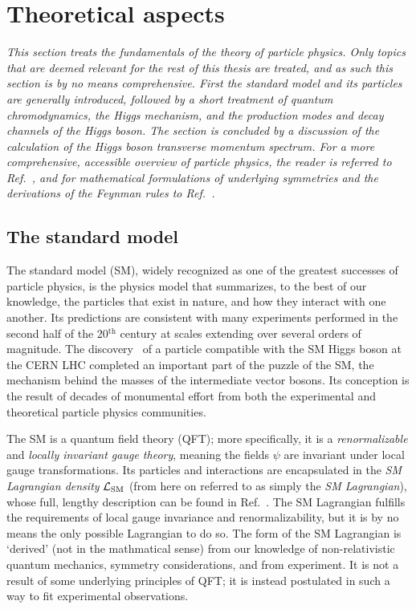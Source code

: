 \section{Theoretical aspects}

\emph{%
% 
This section treats the fundamentals of the theory of particle physics.
% 
Only topics that are deemed relevant for the rest of this thesis are treated, and as such this section is by no means comprehensive.
%
First the standard model and its particles are generally introduced, followed by a short treatment of quantum chromodynamics, the Higgs mechanism, and the production modes and decay channels of the Higgs boson.
% 
The section is concluded by a discussion of the calculation of the Higgs boson transverse momentum spectrum.
% 
For a more comprehensive, accessible overview of particle physics, the reader is referred to Ref.~\cite{griffiths}, and for mathematical formulations of underlying symmetries and the derivations of the Feynman rules to Ref.~\cite{peskin}.
}

\subsection{The standard model}
\label{sec:sm}

The standard model (SM), widely recognized as one of the greatest successes of particle physics, is the physics model that summarizes, to the best of our knowledge, the particles that exist in nature, and how they interact with one another.
% 
Its predictions are consistent with many experiments performed in the second half of the 20${}^\text{th}$ century at scales extending over several orders of magnitude.
% 
The discovery~\cite{Aad:2012tfa,Chatrchyan:2012xdj,Chatrchyan:2013lba} of a particle compatible with the SM Higgs boson at the CERN LHC completed an important part of the puzzle of the SM, the mechanism behind the masses of the intermediate vector bosons.
% 
Its conception is the result of decades of monumental effort from both the experimental and theoretical particle physics communities.


The SM is a quantum field theory (QFT); more specifically, it is a \textit{renormalizable} and \textit{locally invariant gauge theory}, meaning the fields $\psi$ are invariant under local gauge transformations.
% 
Its particles and interactions are encapsulated in the \textit{SM Lagrangian density} $\mathcal{L}_\text{SM}$ (from here on referred to as simply the \textit{SM Lagrangian}), whose full, lengthy description can be found in Ref.~\cite{fullsmlagrangian}.
% 
The SM Lagrangian fulfills the requirements of local gauge invariance and renormalizability, but it is by no means the only possible Lagrangian to do so.
% 
The form of the SM Lagrangian is `derived' (not in the mathmatical sense) from our knowledge of non-relativistic quantum mechanics, symmetry considerations, and from experiment.
% 
It is not a result of some underlying principles of QFT; it is instead postulated in such a way to fit experimental observations.


